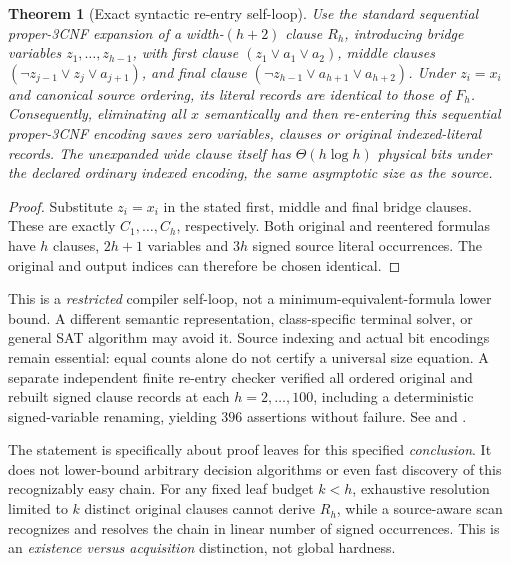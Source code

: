 \documentclass[11pt]{article}
\newtheorem{theorem}{Theorem}
\begin{document}
\begin{theorem}[Exact syntactic re-entry self-loop]
Use the standard sequential proper-3CNF expansion of a width-$(h+2)$
clause $R_h$, introducing bridge variables $z_1,\ldots,z_{h-1}$,
with first clause $(z_1\vee a_1\vee a_2)$,
middle clauses $(\neg z_{j-1}\vee z_j\vee a_{j+1})$,
and final clause $(\neg z_{h-1}\vee a_{h+1}\vee a_{h+2})$.
Under $z_i=x_i$ and canonical source ordering, its literal records
are \emph{identical} to those of $F_h$.
Consequently, eliminating all $x$ semantically and then re-entering
this sequential proper-3CNF encoding saves \emph{zero} variables,
clauses or original indexed-literal records. The unexpanded wide
clause itself has $\Theta(h\log h)$ physical bits under the declared
ordinary indexed encoding, the same asymptotic size as the source.
\end{theorem}
\begin{proof}
Substitute $z_i=x_i$ in the stated first, middle and final
bridge clauses. These are exactly $C_1,\ldots,C_h$,
respectively. Both original and reentered formulas have $h$
clauses, $2h+1$ variables and $3h$ signed source literal occurrences.
The original and output indices can therefore be chosen identical.
\end{proof}
\noindent This is a \emph{restricted} compiler self-loop, not a
minimum-equivalent-formula lower bound. A different semantic
representation, class-specific terminal solver, or general SAT
algorithm may avoid it. Source indexing and actual bit encodings
remain essential: equal counts alone do not certify a universal
size equation. A separate independent finite re-entry checker verified
all ordered original and rebuilt signed clause records at each
$h=2,\ldots,100$, including a deterministic signed-variable
renaming, yielding $396$ assertions without failure.
See 
and .

\noindent The statement is specifically about proof leaves for this
specified \emph{conclusion}. It does not lower-bound arbitrary decision
algorithms or even fast discovery of this recognizably easy chain.
For any fixed leaf budget $k<h$, exhaustive resolution limited to
$k$ distinct original clauses cannot derive $R_h$, while a
source-aware scan recognizes and resolves the chain in linear
number of signed occurrences. This is an \emph{existence versus
acquisition} distinction, not global hardness.
\end{document}
